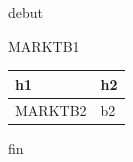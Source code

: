 \documentclass[11pt,a4paper]{article}
\begin{document}
debut

MARKTB1

\begin{table}[h]
\begin{tabular}{|l|l|}
\hline
h1 & h2 \\ \hline
MARKTB2 & b2 \\ \hline
\end{tabular}
\end{table}

fin
\end{document}
